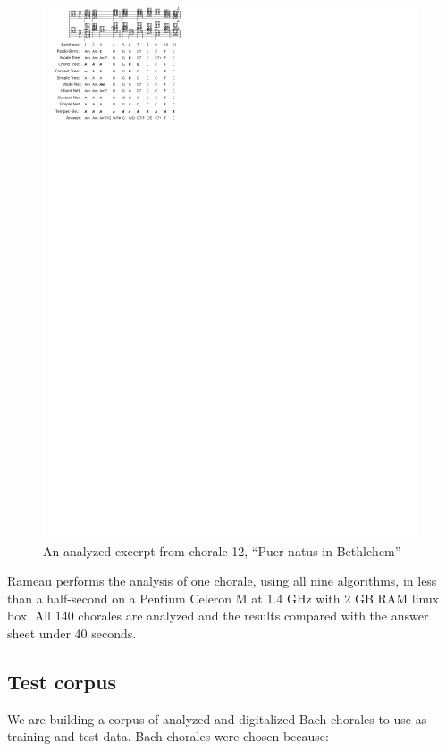 \documentclass{article}
\begin{document}
\begin{figure}
  \centering
  \includegraphics[scale=4]{coral-012}
  \caption{An analyzed excerpt from chorale 12, ``Puer natus in Bethlehem''}
  \label{fig:coral-12}
\end{figure}

Rameau performs the analysis of one chorale, using all nine
algorithms, in less than a half-second on a Pentium Celeron M at 1.4
GHz with 2 GB RAM linux box. All 140 chorales are analyzed and the
results compared with the answer sheet under 40 seconds.

\subsection{Test corpus}
\label{sec:test-corpus}

We are building a corpus of analyzed and digitalized Bach chorales to
use as training and test data. Bach chorales were chosen because:
\end{document}
